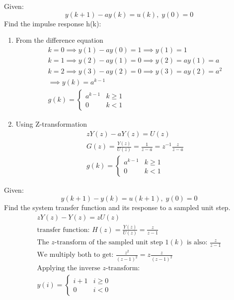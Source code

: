 \documentclass[12pt]{article}
\newenvironment{problem}[2][Problem]{\begin{trivlist}
\item[\hskip \labelsep {\bfseries #1}\hskip \labelsep {\bfseries #2.}]}{\end{trivlist}}
\begin{document}
\pagebreak
\begin{problem}{4}
    Given:
    $$ y(k+1) -ay(k)=u(k),\;y(0)=0$$
    Find the impulse response h(k):
    \begin{enumerate}[label=\alph*)]
        \item From the difference equation
        \begin{align*}
            k = 0 \implies y(1) - ay(0) = 1 \implies y(1) = 1\\
            k = 1 \implies y(2) - ay(1) = 0 \implies y(2) = ay(1) = a\\
            k = 2 \implies y(3) - ay(2) = 0 \implies y(3) = ay(2) = a^2\\
            \implies y(k) = a^{k-1}\\
            g(k) = \begin{cases}
                a^{k-1} & k \geq 1\\
                0 & k < 1
            \end{cases}
        \end{align*}
        \item Using Z-transformation
        \begin{align*}
            zY(z) -aY(z) = U(z)\\
            G(z) = \frac{Y(z)}{U(z)} = \frac{1}{z-a} = z^{-1}\frac{z}{z-a}\\
            g(k) = \begin{cases}
                a^{k-1} & k \geq 1\\
                0 & k < 1
            \end{cases}
        \end{align*}
    \end{enumerate}
\end{problem}
\pagebreak
\begin{problem}{5}
    Given:
    $$y(k+1)-y(k)=u(k+1),\;y(0)=0$$
    Find the system transfer function and its response to a sampled unit step.
    \begin{align*}
        zY(z) - Y(z) = zU(z)\\
        \text{transfer function: }H(z) = \frac{Y(z)}{U(z)} = \frac{z}{z-1}\\
        \text{The $z$-transform of the sampled unit step $1(k)$ is also: } \frac{z}{z-1}\\
        \text{We multiply both to get: } \frac{z^2}{(z-1)^2} = z\frac{z}{(z-1)^2}\\
        \text{Applying the inverse $z$-transform:}\\
        y(i) = \begin{cases}
            i+1 & i \geq 0\\
            0 & i < 0
        \end{cases}
    \end{align*}
\end{problem}
 
\end{document}
